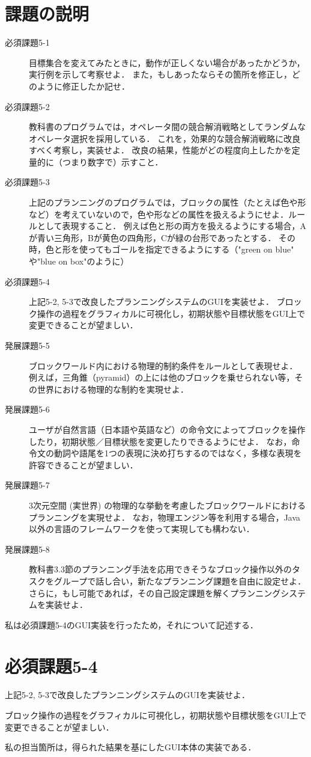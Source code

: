 \documentclass[12pt]{jarticle}
\begin{document}
\section{課題の説明}
\begin{description}
\item[必須課題5-1] 目標集合を変えてみたときに，動作が正しくない場合があったかどうか，実行例を示して考察せよ．
また，もしあったならその箇所を修正し，どのように修正したか記せ．
\item[必須課題5-2] 教科書のプログラムでは，オペレータ間の競合解消戦略としてランダムなオペレータ選択を採用している．
これを，効果的な競合解消戦略に改良すべく考察し，実装せよ．
改良の結果，性能がどの程度向上したかを定量的に（つまり数字で）示すこと．
\item[必須課題5-3] 上記のプランニングのプログラムでは，ブロックの属性（たとえば色や形など）を考えていないので，色や形などの属性を扱えるようにせよ．ルールとして表現すること．
例えば色と形の両方を扱えるようにする場合，Aが青い三角形，Bが黄色の四角形，Cが緑の台形であったとする．
その時，色と形を使ってもゴールを指定できるようにする（"green on blue" や"blue on box"のように）
\item[必須課題5-4] 上記5-2, 5-3で改良したプランニングシステムのGUIを実装せよ．
ブロック操作の過程をグラフィカルに可視化し，初期状態や目標状態をGUI上で変更できることが望ましい．
\item[発展課題5-5] ブロックワールド内における物理的制約条件をルールとして表現せよ．
例えば，三角錐（pyramid）の上には他のブロックを乗せられない等，その世界における物理的な制約を実現せよ．
\item[発展課題5-6] ユーザが自然言語（日本語や英語など）の命令文によってブロックを操作したり，初期状態／目標状態を変更したりできるようにせよ．
なお，命令文の動詞や語尾を1つの表現に決め打ちするのではなく，多様な表現を許容できることが望ましい．
\item[発展課題5-7] 3次元空間 (実世界) の物理的な挙動を考慮したブロックワールドにおけるプランニングを実現せよ．
なお，物理エンジン等を利用する場合，Java以外の言語のフレームワークを使って実現しても構わない．
\item[発展課題5-8] 教科書3.3節のプランニング手法を応用できそうなブロック操作以外のタスクをグループで話し合い，新たなプランニング課題を自由に設定せよ．
さらに，もし可能であれば，その自己設定課題を解くプランニングシステムを実装せよ．
\end{description}
私は必須課題5-4のGUI実装を行ったため，それについて記述する．

\section{必須課題5-4}
\begin{screen}
  上記5-2, 5-3で改良したプランニングシステムのGUIを実装せよ．\par
ブロック操作の過程をグラフィカルに可視化し，初期状態や目標状態をGUI上で変更できることが望ましい．
\end{screen}
私の担当箇所は，得られた結果を基にしたGUI本体の実装である．
\end{document}
